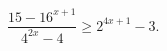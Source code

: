 \begin{ex}[type=inequality]
	\begin{condition}
		$\dfrac{15-16^{x + 1}}{4^{2x} - 4}\geqslant2^{4x + 1} - 3  .$
	\end{condition}
\end{ex}